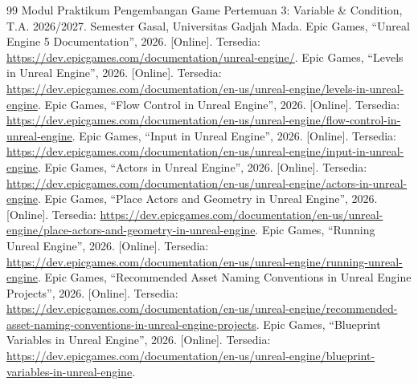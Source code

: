 \documentclass[a4paper,oneside,12pt]{report}
\renewcommand{\bibname}{Daftar Pustaka}
\begin{document}
\clearpage
{}
\renewcommand{\bibname}{Daftar Pustaka}
\begin{thebibliography}{99}
     Modul Praktikum Pengembangan Game Pertemuan 3: Variable \& Condition, T.A. 2026/2027. Semester Gasal, Universitas Gadjah Mada.
     Epic Games, ``Unreal Engine 5 Documentation'', 2026. [Online]. Tersedia: \url{https://dev.epicgames.com/documentation/unreal-engine/}.
     Epic Games, ``Levels in Unreal Engine'', 2026. [Online]. Tersedia: \url{https://dev.epicgames.com/documentation/en-us/unreal-engine/levels-in-unreal-engine}.
     Epic Games, ``Flow Control in Unreal Engine'', 2026. [Online]. Tersedia: \url{https://dev.epicgames.com/documentation/en-us/unreal-engine/flow-control-in-unreal-engine}.
     Epic Games, ``Input in Unreal Engine'', 2026. [Online]. Tersedia: \url{https://dev.epicgames.com/documentation/en-us/unreal-engine/input-in-unreal-engine}.
     Epic Games, ``Actors in Unreal Engine'', 2026. [Online]. Tersedia: \url{https://dev.epicgames.com/documentation/en-us/unreal-engine/actors-in-unreal-engine}.
     Epic Games, ``Place Actors and Geometry in Unreal Engine'', 2026. [Online]. Tersedia: \url{https://dev.epicgames.com/documentation/en-us/unreal-engine/place-actors-and-geometry-in-unreal-engine}.
     Epic Games, ``Running Unreal Engine'', 2026. [Online]. Tersedia: \url{https://dev.epicgames.com/documentation/en-us/unreal-engine/running-unreal-engine}.
     Epic Games, ``Recommended Asset Naming Conventions in Unreal Engine Projects'', 2026. [Online]. Tersedia: \url{https://dev.epicgames.com/documentation/en-us/unreal-engine/recommended-asset-naming-conventions-in-unreal-engine-projects}.
     Epic Games, ``Blueprint Variables in Unreal Engine'', 2026. [Online]. Tersedia: \url{https://dev.epicgames.com/documentation/en-us/unreal-engine/blueprint-variables-in-unreal-engine}.
\end{thebibliography}
\end{document}
